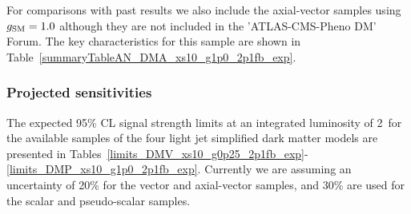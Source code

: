 \clearpage 

\clearpage
For comparisons with past results we also include the axial-vector samples using $g_{\rm SM} = 1.0$ although they are not included in the 
'ATLAS-CMS-Pheno DM' Forum. The key characteristics for this sample are shown in Table~\ref{summaryTableAN_DMA_xs10_g1p0_2p1fb_exp}.




\subsubsection{Projected sensitivities}

The expected 95\% CL signal strength limits at an integrated luminosity of 2~\ifb for
the available samples of the four light jet simplified dark matter models are
presented in
Tables~\ref{limits_DMV_xs10_g0p25_2p1fb_exp}-\ref{limits_DMP_xs10_g1p0_2p1fb_exp}.
Currently we are assuming an uncertainty of 20\% for the vector and axial-vector samples, and 30\% are used 
for the scalar and pseudo-scalar samples.





\clearpage

%
% 
% 
% 

\clearpage

% 
\clearpage









